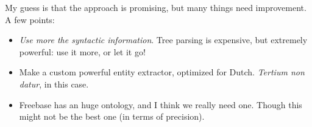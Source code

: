 \documentclass[11pt,leqno,fleqn]{article}
\begin{document}
My guess is that the approach is promising, but many things need improvement. A few points:
\begin{itemize}
\item \emph{Use more the syntactic information}. Tree parsing is expensive, but extremely powerful: use it more, or let it go!
\item Make a custom powerful entity extractor, optimized for Dutch. \emph{Tertium non datur}, in this case.
\item Freebase has an huge ontology, and I think we really need one. Though this might not be the best one (in terms of precision).
\end{itemize}

\end{document}
